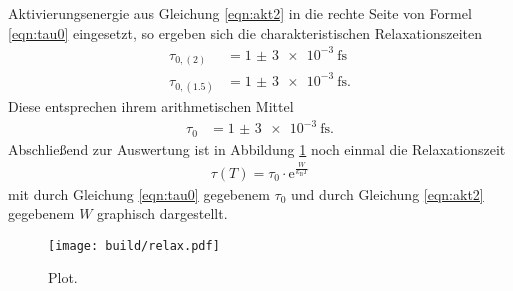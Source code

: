 Aktivierungsenergie aus Gleichung \eqref{eqn:akt2} in die rechte Seite von Formel \eqref{eqn:tau0}
eingesetzt, so ergeben sich die charakteristischen Relaxationszeiten
\begin{align}
  \tau_{0,(2)} &= \SI{1(3)e-3}{\femto\second} \\
  \tau_{0,(1.5)} &= \SI{1(3)e-3}{\femto\second}.
\end{align}
Diese entsprechen ihrem arithmetischen Mittel
\begin{align}
  \tau_0 &= \SI{1(3)e-3}{\femto\second}.
  \label{eqn:tau0}
\end{align}
Abschließend zur Auswertung ist in Abbildung \ref{fig:relaxationszeit} noch einmal die Relaxationszeit
\begin{align}
  \tau(T) = \tau_0 \cdot \mathrm{e}^{\frac{W}{k_\text{B} T}}
\end{align}
mit durch Gleichung \eqref{eqn:tau0} gegebenem $\tau_0$ und durch Gleichung \eqref{eqn:akt2} gegebenem
$W$ graphisch dargestellt.

\begin{figure}
  \centering
  \texttt{[image: build/relax.pdf]}
  \caption{Plot.}
  \label{fig:relaxationszeit}
\end{figure}
